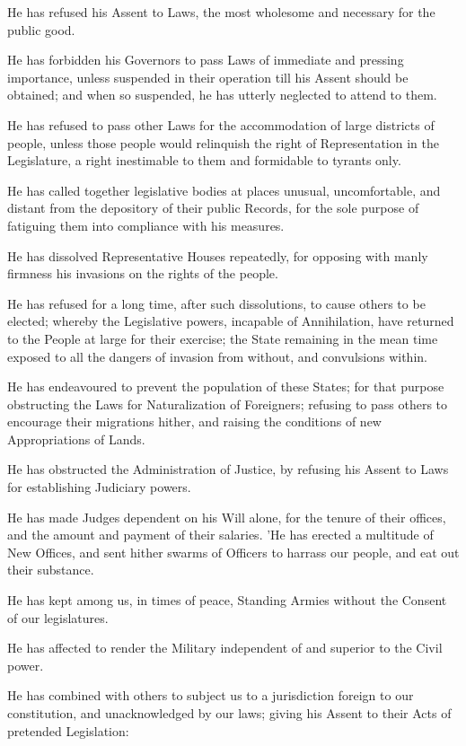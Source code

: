 He has refused his Assent to Laws, the most wholesome and necessary
for the public good.

He has forbidden his Governors to pass Laws of immediate and pressing
importance, unless suspended in their operation till his Assent should
be obtained; and when so suspended, he has utterly neglected to
attend to them.

He has refused to pass other Laws for the accommodation of large
districts of people, unless those people would relinquish the right of
Representation in the Legislature, a right inestimable to them and
formidable to tyrants only.

He has called together legislative bodies at places unusual,
uncomfortable, and distant from the depository of their public
Records, for the sole purpose of fatiguing them into compliance with
his measures.

He has dissolved Representative Houses repeatedly, for opposing with
manly firmness his invasions on the rights of the people.

He has refused for a long time, after such dissolutions, to cause
others to be elected; whereby the Legislative powers, incapable of
Annihilation, have returned to the People at large for their exercise;
the State remaining in the mean time exposed to all the dangers of
invasion from without, and convulsions within.

He has endeavoured to prevent the population of these States; for that
purpose obstructing the Laws for Naturalization of Foreigners;
refusing to pass others to encourage their migrations hither, and
raising the conditions of new Appropriations of Lands.

He has obstructed the Administration of Justice, by refusing his
Assent to Laws for establishing Judiciary powers.

He has made Judges dependent on his Will alone, for the tenure of
their offices, and the amount and payment of their salaries. 'He has
erected a multitude of New Offices, and sent hither swarms of Officers
to harrass our people, and eat out their substance.

He has kept among us, in times of peace, Standing Armies without the
Consent of our legislatures.

He has affected to render the Military independent of and superior to
the Civil power.

He has combined with others to subject us to a jurisdiction foreign to
our constitution, and unacknowledged by our laws; giving his Assent to
their Acts of pretended Legislation:

